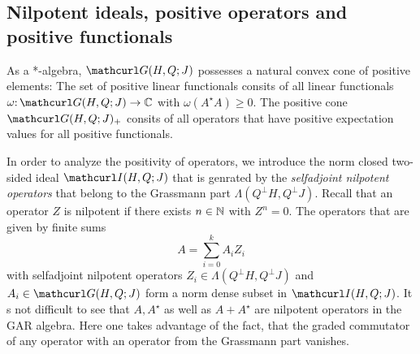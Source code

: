 \documentclass[pra,twoside,amsmath,amsfonts,amssymb,superscriptaddress,showpacs]{revtex4}
\def\7#1{{\Bbb #1}}
\def\9#1{{\mathcurl #1}}
\newcommand{\GR}[2]{\Lambda(#1,#2)}
\newcommand{\GAR}[3]{\9G(#1,#3;#2)}
\newcommand{\IDL}[3]{\9I(#1,#3;#2)}
\newcommand{\ADJ}{\star}
\begin{document}
\subsection{Nilpotent ideals, positive operators and positive functionals}
\label{subsec:ideals,positivity}
As a *-algebra, $\GAR{H}{J}{Q}$ possesses a natural convex cone of positive elements: The set of
positive linear functionals consits of all linear functionals
$\omega\mathpunct:\GAR{H}{J}{Q}\to\7C$ with $\omega(A^\ADJ A)\geq 0$. The positive cone
$\GAR{H}{J}{Q}_+$ consits of all operators that have positive expectation values for all positive
functionals.

In order to analyze the positivity of operators, we introduce the norm closed two-sided ideal
$\IDL{H}{J}{Q}$ that is genrated by the {\em selfadjoint nilpotent operators} that belong to the
Grassmann part $\GR{Q^\perp H}{Q^\perp J}$. Recall that an operator $Z$ is nilpotent if there exists
$n\in\7N$ with $Z^n=0$. The operators that are given by finite sums 
\begin{equation}
A=\sum_{i=0}^k A_i Z_i
\end{equation}
with selfadjoint nilpotent operators $Z_i\in\GR{Q^\perp H}{Q^\perp J}$ and $A_i\in \GAR{H}{J}{Q}$
form a norm dense subset in $\IDL{H}{J}{Q}$. It s not difficult to see that $A,A^\ADJ$ as well as
$A+A^\ADJ$ are nilpotent operators in the GAR algebra. Here one takes advantage of the fact, that
the graded commutator of any operator with an operator from the Grassmann part vanishes. 
\end{document}
